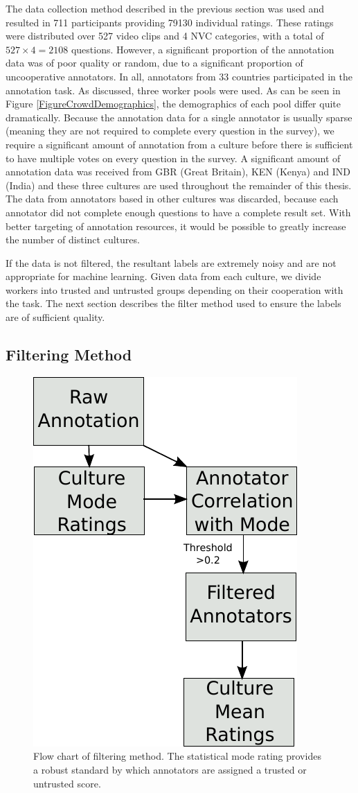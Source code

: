The data collection method described in the previous section was used and resulted in 711 participants providing 79130 individual ratings. These ratings were distributed over 527 video clips and 4 \ac{NVC} categories, with a total of $527 \times 4 = 2108$ questions. However, a significant proportion of the annotation data was of poor quality or random, due to a significant proportion of uncooperative annotators. In all, annotators from 33 countries participated in the annotation task. As discussed, three worker pools were used. As can be seen in Figure \ref{FigureCrowdDemographics}, the demographics of each pool differ quite dramatically. Because the annotation data for a single annotator is usually sparse (meaning they are not required to complete every question in the survey), we require a significant amount of annotation from a culture before there is sufficient to have multiple votes on every question in the survey. A significant amount of annotation data was received from GBR (Great Britain), KEN (Kenya) and IND (India) and these three cultures are used throughout the remainder of this thesis. The data from annotators based in other cultures was discarded, because each annotator did not complete enough questions to have a complete result set. With better targeting of annotation resources, it would be possible to greatly increase the number of distinct cultures.

If the data is not filtered, the resultant labels are extremely noisy and are not appropriate for machine learning. Given data from each culture, we divide workers into trusted and untrusted groups depending on their cooperation with the task. The next section describes the filter method used to ensure the labels are of sufficient quality.

\subsection{Filtering Method}
\label{SectionAnnotationFilterMethod}

\begin{figure}
\centering
\includegraphics[width = 0.3 \columnwidth]{annotation/FlowAnnotationFiltering.pdf}
\caption{Flow chart of filtering method. The statistical mode rating provides a robust standard by which annotators are assigned a trusted or untrusted score.}
\label{FigureFilterFlowChart}
\end{figure}

